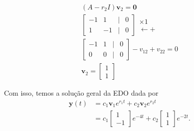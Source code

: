 \begin{resol}
    \begin{gather}
    (A-r_2I)\pmb{v}_2 = \pmb{0} \\
    \begin{bmatrix}
      -1 & 1 & | & 0\\
      1 & -1 & | & 0
    \end{bmatrix}
    \begin{matrix}
      \times 1 \\
      \leftarrow +
    \end{matrix}\\
    \begin{bmatrix}
      -1 & 1 & | & 0\\
      0 & 0 & | & 0
    \end{bmatrix}
    -v_{12}+v_{22}=0\\
    \pmb{v}_2 =
    \begin{bmatrix}
      1\\
      1
    \end{bmatrix}
  \end{gather}

  Com isso, temos a solução geral da EDO dada por
  \begin{align}
    \pmb{y}(t) &= c_1\pmb{v}_1e^{r_1t} + c_2\pmb{v}_2e^{r_2t} \\
               &= c_1
                 \begin{bmatrix}
                   1 \\
                   -1
                 \end{bmatrix}e^{-4t} + c_2
    \begin{bmatrix}
      1 \\
      1
    \end{bmatrix}e^{-2t}.
  \end{align}


\end{resol}
